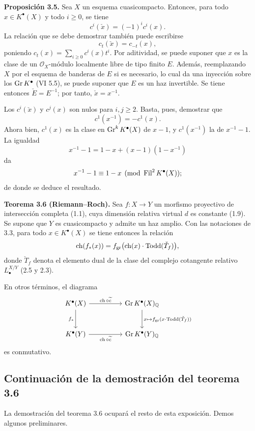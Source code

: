\textbf{Proposición 3.5.} Sea $X$ un esquema cuasicompacto. Entonces, para todo
$x\in K^{\bullet}(X)$ y todo $i\geq0$, se tiene
\[
c^i(\check x)=(-1)^i c^i(x).
\]
La relación que se debe demostrar también puede escribirse
\[
c_t(\check x)=c_{-t}(x),
\]
poniendo $c_t(x)=\sum_{i\geq0}c^i(x)t^i$.
Por aditividad, se puede suponer que $x$ es la clase de un
$\mathcal O_X$-módulo localmente libre de tipo finito $E$. Además,
reemplazando $X$ por el esquema de banderas de $E$ si es necesario, lo cual da
una inyección sobre los $\operatorname{Gr} K^{\bullet}$ (VI 5.5), se puede suponer que $E$ es
un haz invertible. Se tiene entonces $\check E=E^{-1}$; por tanto,
$\check x=x^{-1}$.

Los $c^i(\check x)$ y $c^j(x)$ son nulos para $i,j\geq2$. Basta, pues,
demostrar que
\[
c^1(x^{-1})=-c^1(x).
\]
Ahora bien, $c^1(x)$ es la clase en $\operatorname{Gr}^kK^{\bullet}(X)$ de $x-1$, y
$c^1(x^{-1})$ la de $x^{-1}-1$. La igualdad
\[
x^{-1}-1=1-x+(x-1)(1-x^{-1})
\]
da
\[
x^{-1}-1\equiv1-x\pmod{\operatorname{Fil}^2K^{\bullet}(X)};
\]
de donde se deduce el resultado.

\textbf{Teorema 3.6 (Riemann--Roch).} Sea $f:X\to Y$ un morfismo proyectivo de
intersección completa (1.1), cuya dimensión relativa virtual $d$ es constante
(1.9). Se supone que $Y$ es cuasicompacto y admite un haz amplio. Con las
notaciones de 3.3, para todo $x\in K^{\bullet}(X)$ se tiene entonces la relación
\[
\operatorname{ch}(f_*(x))=f_{\mathrm{gr}}\bigl(\operatorname{ch}(x)\cdot\operatorname{Todd}(\check T_f)\bigr),
\]
donde $\check T_f$ denota el elemento dual de la clase del complejo cotangente
relativo $L^{X/Y}_\bullet$ (2.5 y 2.3).

En otros términos, el diagrama
\[
\begin{tikzcd}[column sep=huge,row sep=large]
K^{\bullet}(X) \arrow[r,"\ch\circ\widetilde c"] \arrow[d,"f_*"'] & \Gr K^{\bullet}(X)_{\mathbb Q} \arrow[d,"x\mapsto f_{\mathrm{gr}}(x\cdot\Todd(\check T_f))"]\\
K^{\bullet}(Y) \arrow[r,"\ch\circ\widetilde c"'] & \Gr K^{\bullet}(Y)_{\mathbb Q}
\end{tikzcd}
\]
es conmutativo.



\subsection*{Continuación de la demostración del teorema 3.6}

La demostración del teorema 3.6 ocupará el resto de esta exposición. Demos
algunos preliminares.

